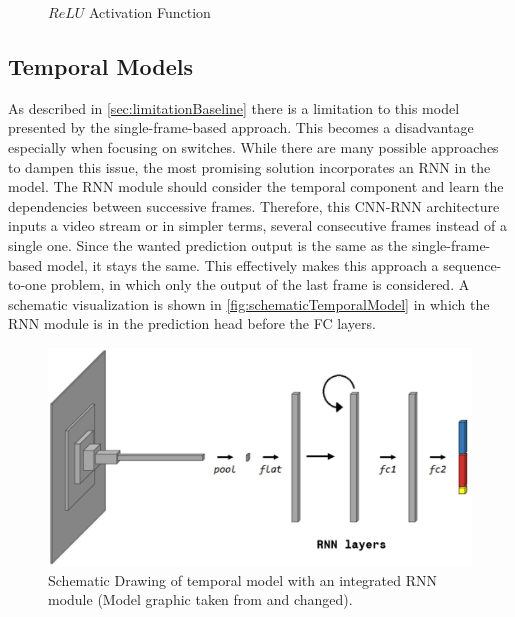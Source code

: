 \begin{figure}[H]
    \centering
    \caption{$ReLU$ Activation Function \cite{pytorch_relu_docu}}
    \label{fig:ReLU}
\end{figure}

\subsection{Temporal Models}
\label{sec:temporalModels}

As described in \autoref{sec:limitationBaseline} there is a limitation to this model presented by the single-frame-based approach.
This becomes a disadvantage especially when focusing on switches.
While there are many possible approaches to dampen this issue, the most promising solution incorporates an \ac{RNN} in the model.
The \ac{RNN} module should consider the temporal component and learn the dependencies between successive frames.
Therefore, this \ac{CNN}-\ac{RNN} architecture inputs a video stream or in simpler terms, several consecutive frames instead of a single one.
Since the wanted prediction output is the same as the single-frame-based model, it stays the same.
This effectively makes this approach a sequence-to-one problem, in which only the output of the last frame is considered.
A schematic visualization is shown in \autoref{fig:schematicTemporalModel} in which the \ac{RNN} module is in the prediction head before the \ac{FC} layers.

\begin{figure}[H]
    \centering
    \includegraphics[width=0.5\linewidth]{PICs//temporalModels/schematicDrawing.jpg}
    \caption{Schematic Drawing of temporal model with an integrated \ac{RNN} module (Model graphic taken from \cite{tepNet2024} and changed).}
    \label{fig:schematicTemporalModel}
\end{figure}

